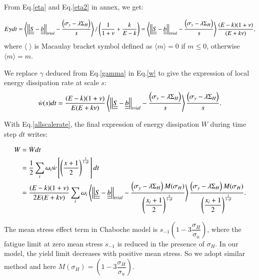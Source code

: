 \documentclass[3p,times,number,review]{elsarticle}
\begin{document}
From Eq.\eqref{eta} and Eq.\eqref{eta2} in annex, we get:

\begin{equation}E\gamma dt=\left\langle \left| \left|\uline{\uline{S}}-\uline{\uline{b}}\right| \right|_{trial}-\dfrac{ \left(\sigma_y-\lambda \Sigma_H\right)}{s}\right\rangle /\left(\dfrac{1}{1+\nu}+\dfrac{k}{E-k} \right)=\left\langle \left| \left|\uline{\uline{S}}-\uline{\uline{b}}\right| \right|_{trial}-\dfrac{ \left(\sigma_y-\lambda \Sigma_H\right)}{s}\right\rangle\dfrac{(E-k)(1+\nu) }{(E+k\nu)},
\label{gamma}
\end{equation}
where $\langle$ $\rangle$ is Macaulay bracket symbol defined as $\langle m\rangle=0$ if $m\leqslant0$, otherwise $\langle m\rangle=m$.

We replace $\gamma$ deduced from Eq.\eqref{gamma} in Eq.\eqref{w} to give the expression of local energy dissipation rate at scale $s$:
\begin{equation}
\dot{w}(s)dt=\dfrac{(E-k)(1+\nu) }{E(E+k\nu)}\left\langle  \left| \left|\uline{\uline{S}}-\uline{\uline{b}}\right| \right|_{trial}-\dfrac{ \left(\sigma_y-\lambda \Sigma_H\right)}{s}\right\rangle \dfrac{ \left(\sigma_y-\lambda \Sigma_H\right)}{s}.
\label{dW}
\end{equation}

With Eq.\eqref{allscalerate}, the final expression of energy dissipation $W$ during time step $dt$ writes:

\begin{equation}
\begin{split}
W&=\dot{W}dt
\\&=\frac{1}{2}\sum_{i}\omega_i\dot{w}\left[  \left( \frac{x+1}{2}\right) ^{\frac{1}{1-\beta}}\right]dt
\\&=\dfrac{(E-k)(1+\nu) }{2E(E+k\nu)}\sum_{i}\omega_i\left\langle  \left| \left|\uline{\uline{S}}-\uline{\uline{b}}\right| \right|_{trial}-\dfrac{\left(\sigma_y-\lambda \Sigma_H\right) M(\sigma_H)}{\left( \dfrac{x_i+1}{2}\right) ^{\frac{1}{1-\beta}}}\right\rangle \dfrac{\left(\sigma_y-\lambda \Sigma_H\right) M(\sigma_H)}{\left( \dfrac{x_i+1}{2}\right)^{\frac{1}{1-\beta}}}.
\end{split}
\label{finaldw}
\end{equation}

The mean stress effect term in Chaboche model is $s_{-1}\left(1-3\dfrac{\sigma_H}{\sigma_u} \right)$, where the fatigue limit at zero mean stress $s_{-1}$ is reduced in the presence of $\sigma_H$. In our model, the yield limit decreases with positive mean stress. So we adopt similar method and here $M(\sigma_H)=\left(1-3\dfrac{\sigma_H}{\sigma_u} \right)$.
\end{document}
